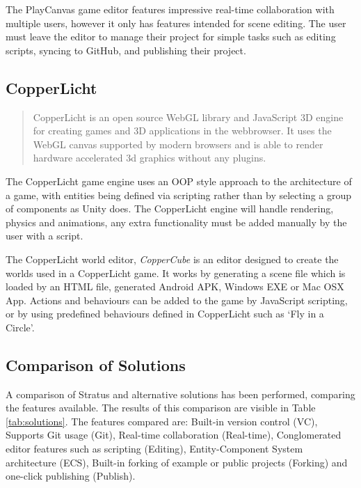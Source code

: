 The PlayCanvas game editor features impressive real-time collaboration with multiple users, however it only has features intended for scene editing. The user must leave the editor to manage their project for simple tasks such as editing scripts, syncing to GitHub, and publishing their project.

\subsection{CopperLicht}
\begin{quote}
CopperLicht is an open source WebGL library and JavaScript 3D engine for creating games and 3D applications in the webbrowser. It uses the WebGL canvas supported by modern browsers and is able to render hardware accelerated 3d graphics without any plugins.\cite{copperlicht}
\end{quote}

The CopperLicht game engine uses an OOP style approach to the architecture of a game, with entities being defined via scripting rather than by selecting a group of components as Unity does. The CopperLicht engine will handle rendering, physics and animations, any extra functionality must be added manually by the user with a script.\cite{copperlichtfeatures}

The CopperLicht world editor, \emph{CopperCube} is an editor designed to create the worlds used in a CopperLicht game. It works by generating a scene file which is loaded by an HTML file, generated Android APK, Windows EXE or Mac OSX App.\cite{coppercubefeatures} Actions and behaviours can be added to the game by JavaScript scripting, or by using predefined behaviours defined in CopperLicht such as `Fly in a Circle'.\cite{copperlichtbehaviours}

\subsection{Comparison of Solutions}
A comparison of Stratus and alternative solutions has been performed, comparing the features available. The results of this comparison are visible in Table \ref{tab:solutions}. The features compared are: Built-in version control (VC), Supports Git usage (Git), Real-time collaboration (Real-time), Conglomerated editor features such as scripting (Editing), Entity-Component System architecture (ECS), Built-in forking of example or public projects (Forking) and one-click publishing (Publish).

